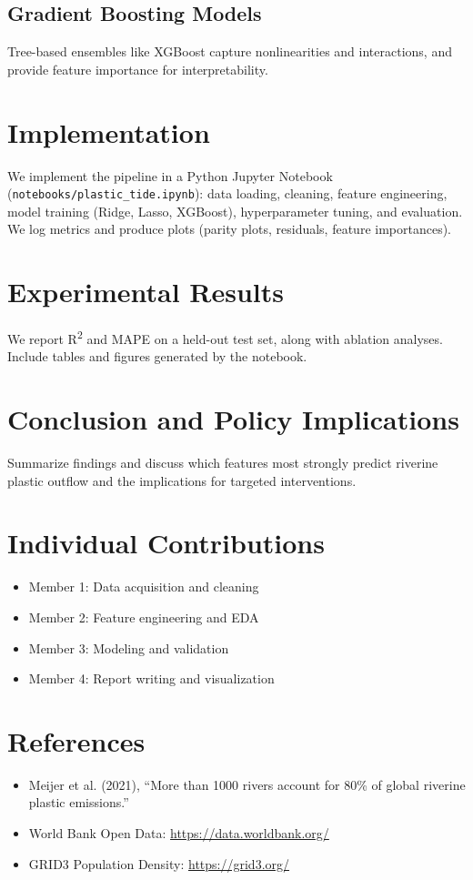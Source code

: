 \documentclass[11pt,a4paper]{article}
\begin{document}
\subsection{Gradient Boosting Models}
Tree-based ensembles like XGBoost capture nonlinearities and interactions, and provide feature importance for interpretability.

\section{Implementation}
\label{sec:implementation}
We implement the pipeline in a Python Jupyter Notebook (\texttt{notebooks/plastic_tide.ipynb}): data loading, cleaning, feature engineering, model training (Ridge, Lasso, XGBoost), hyperparameter tuning, and evaluation. We log metrics and produce plots (parity plots, residuals, feature importances).

\section{Experimental Results}
\label{sec:results}
We report R\textsuperscript{2} and MAPE on a held-out test set, along with ablation analyses. Include tables and figures generated by the notebook.

\section{Conclusion and Policy Implications}
Summarize findings and discuss which features most strongly predict riverine plastic outflow and the implications for targeted interventions.

\section*{Individual Contributions}
\begin{itemize}[leftmargin=*]
  \item Member 1: Data acquisition and cleaning
  \item Member 2: Feature engineering and EDA
  \item Member 3: Modeling and validation
  \item Member 4: Report writing and visualization
\end{itemize}

\section*{References}
\begin{itemize}[leftmargin=*]
  \item Meijer et al. (2021), ``More than 1000 rivers account for 80\% of global riverine plastic emissions.''
  \item World Bank Open Data: \url{https://data.worldbank.org/}
  \item GRID3 Population Density: \url{https://grid3.org/}
\end{itemize}
\end{document}
